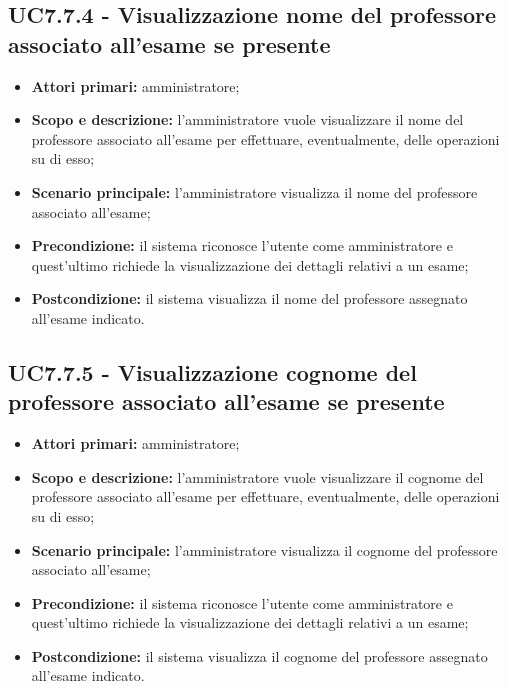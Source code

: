 \documentclass[AnalisiDeiRequisiti.tex]{subfiles}
\begin{document}
\subsection{UC7.7.4 - Visualizzazione nome del professore associato all'esame se presente}
\begin{itemize}
	\item \textbf{Attori primari:} amministratore;
	\item \textbf{Scopo e descrizione:} l'amministratore vuole visualizzare il nome del professore associato all'esame per effettuare, eventualmente, delle operazioni su di esso;
	\item \textbf{Scenario principale:} l'amministratore visualizza il nome del professore associato all'esame;
	\item \textbf{Precondizione:} il sistema riconosce l'utente come amministratore e quest'ultimo richiede la visualizzazione dei dettagli relativi a un esame; 
	\item \textbf{Postcondizione:} il sistema visualizza il nome del professore assegnato all'esame indicato.
\end{itemize}
\subsection{UC7.7.5 - Visualizzazione cognome del professore associato all'esame se presente}
\begin{itemize}
	\item \textbf{Attori primari:} amministratore;
	\item \textbf{Scopo e descrizione:} l'amministratore vuole visualizzare il cognome del professore associato all'esame per effettuare, eventualmente, delle operazioni su di esso;
	\item \textbf{Scenario principale:} l'amministratore visualizza il cognome del professore associato all'esame;
	\item \textbf{Precondizione:} il sistema riconosce l'utente come amministratore e quest'ultimo richiede la visualizzazione dei dettagli relativi a un esame; 
	\item \textbf{Postcondizione:} il sistema visualizza il cognome del professore assegnato all'esame indicato.
\end{itemize}
\end{document}
